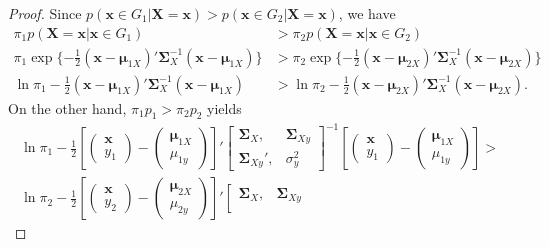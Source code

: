 \documentclass[12pt]{article}
\begin{document}
\begin{proof} {}{}
Since $p(\bm x \in G_1 | \bm X = \bm x) > p(\bm x \in G_2 | \bm X = \bm x)$, we have
\begin{align}\label{propproof1}
\pi_1 p(\bm X = \bm x | \bm x \in G_1) &> \pi_2 p(\bm X = \bm x | \bm x \in G_2)   \nonumber \\
\pi_1 \exp \{ -\frac{1}{2} (\bm x - \bm \mu_{1X})' \bm \Sigma_{X}^{-1} (\bm x - \bm \mu_{1X}) \} &> \pi_2 \exp \{ -\frac{1}{2} (\bm x - \bm \mu_{2X})' \bm \Sigma_{X}^{-1} (\bm x - \bm \mu_{2X}) \} \nonumber \\
\ln \pi_1 - \frac{1}{2}(\bm x - \bm \mu_{1X})' \bm \Sigma_{X}^{-1} (\bm x - \bm \mu_{1X}) &> \ln \pi_2 - \frac{1}{2}(\bm x - \bm \mu_{2X})' \bm \Sigma_{X}^{-1} (\bm x - \bm \mu_{2X}).
\end{align}
On the other hand, $\pi_1 p_1 > \pi_2 p_2$ yields
\begin{align}\label{propproof2}
\ln \pi_1 - \frac{1}{2} \left[ \left(\begin{array}{cc}
\bm x       \\
    y_{1}
\end{array} \right) -
\left(\begin{array}{cc}
\bm \mu_{1X}       \\
    \mu_{1y}
\end{array} \right)
\right]'
\left[\begin{array}{cc}
\bm \Sigma_{X},      & \bm \Sigma_{Xy} \\
\bm \Sigma_{Xy}',   & \sigma_{y}^2
\end{array}
\right]^{-1}
\left[ \left(\begin{array}{cc}
\bm x       \\
    y_{1}
\end{array} \right) -
\left(\begin{array}{cc}
\bm \mu_{1X}       \\
    \mu_{1y}
\end{array} \right)
\right] > \nonumber \\
\ln \pi_2 - \frac{1}{2}\left[ \left(\begin{array}{cc}
\bm x       \\
    y_{2}
\end{array} \right) -
\left(\begin{array}{cc}
\bm \mu_{2X}       \\
    \mu_{2y}
\end{array} \right)
\right]'
\left[\begin{array}{cc}
\bm \Sigma_{X},      & \bm \Sigma_{Xy} \\

\end{array}
\end{align}
\end{proof}
\end{document}
